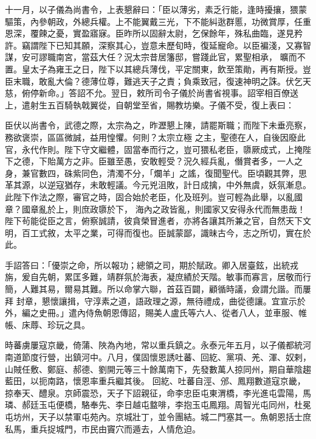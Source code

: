 \begin{pinyinscope}
 十一月，以子儀為尚書令，上表懇辭曰：「臣以薄劣，素乏行能，逢時擾攘，猥蒙驅策，內參朝政，外總兵權。上不能翼戴三光，下不能糾逖群慝，功微賞厚，任重恩深，覆餗之憂，實盈寤寐。臣昨所以固辭太尉，乞保餘年，殊私曲臨，遂見矜許。竊謂陛下已知其願，深察其心，豈意未歷旬時，復延寵命。以臣褊淺，又寡智謀，安可謬職南宮，當茲大任？況太宗昔居籓邸，嘗踐此官，累聖相承，
 曠而不置。皇太子為雍王之日，陛下以其總兵薄伐，平定關東，飲至策勛，再有斯授。豈臣末職，敢亂大倫？德薄位尊，難逃天子之責；負乘致冠，復速神明之誅。伏乞天慈，俯停新命。」答詔不允。翌日，敕所司令子儀於尚書省視事。詔宰相百僚送上，遣射生五百騎執戟翼從，自朝堂至省，賜教坊樂。子儀不受，復上表曰：



 臣伏以尚書令，武德之際，太宗為之，昨瀝懇上陳，請罷斯職；而陛下未垂亮察，務欲褒崇，區區微誠，益用惶懼。何則？太宗立極
 之主，聖德在人，自後因廢此官，永代作則。陛下守文繼體，固當奉而行之，豈可猥私老臣，隳厥成式，上掩陛下之德，下貽萬方之非。臣雖至愚，安敢輕受？況久經兵亂，僭賞者多，一人之身，兼官數四，硃紫同色，清濁不分，「爛羊」之謠，復聞聖代。臣頃觀其弊，思革其源，以逆寇猶存，未敢輕議。今元兇沮敗，計日成擒，中外無虞，妖氛漸息。此陛下作法之際，審官之時，固合始於老臣，化及班列。豈可輕為此舉，以亂國章？國章亂於上，則庶政隳於下，
 海內之政皆亂，則國家又安得永代而無患哉！陛下茍能從臣之言，俯察誠請，彼貪榮冒進者，亦將各讓其所兼之官，自然天下文明，百工式敘，太平之業，可得而復也。臣誠蒙鄙，識昧古今，志之所切，實在於此。



 手詔答曰：「優崇之命，所以報功；總領之司，期於賦政。卿入居臺鉉，出統戎旃，爰自先朝，累匡多難，靖群氛於海表，凝庶績於天階。敏事而寡言，居敬而行簡，人難其易，爾易其難。所以命掌六聯，首茲百闢，顧循時議，僉謂允諧。而屢拜
 封章，懇懷讓揖，守淳素之道，語政理之源，無待禮成，曲從德讓。宜宣示於外，編之史冊。」遣內侍魚朝恩傳詔，賜美人盧氏等六人、從者八人，並車服、帷帳、床蓐、珍玩之具。



 時蕃虜屢寇京畿，倚蒲、陜為內地，常以重兵鎮之。永泰元年五月，以子儀都統河南道節度行營，出鎮河中。八月，僕固懷恩誘吐蕃、回紇、黨項、羌、渾、奴剌，山賊任敷、鄭庭、郝德、劉開元等三十餘萬南下，先發數萬人掠同州，期自華陰趨藍田，以扼南路，懷恩率重兵繼其後。
 回紇、吐蕃自涇、邠、鳳翔數道寇京畿，掠奉天、醴泉。京師震恐，天子下詔親征，命李忠臣屯東渭橋，李光進屯雲陽，馬璘、郝廷玉屯便橋，駱奉先、李日越屯盩啡，李抱玉屯鳳翔。周智光屯同州，杜冕屯坊州，天子以禁軍屯苑內。京城壯丁，並令團結。城二門塞其一。魚朝恩括士庶私馬，重兵捉城門，市民由竇穴而遁去，人情危迫。




\end{pinyinscope}
